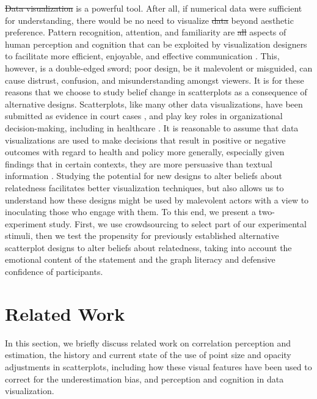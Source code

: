 \documentclass[manuscript,screen,review,anonymous]{acmart}
\providecommand{\DIFaddtex}[1]{{\protect\color{blue}\uwave{#1}}} %
\providecommand{\DIFdeltex}[1]{{\protect\color{red}\sout{#1}}} %
\providecommand{\DIFaddbegin}{} %
\providecommand{\DIFaddend}{} %
\providecommand{\DIFdelbegin}{} %
\providecommand{\DIFdelend}{} %
\providecommand{\DIFadd}[1]{\texorpdfstring{\DIFaddtex{#1}}{#1}} %
\providecommand{\DIFdel}[1]{\texorpdfstring{\DIFdeltex{#1}}{}} %
\newcommand{\DIFscaledelfig}{0.5}
\newlength{\DIFdelgraphicswidth} %
\newlength{\DIFdelgraphicsheight} %
\newcommand{\DIFaddincludegraphics}[2][]{{\color{blue}\fbox{\DIFOincludegraphics[#1]{#2}}}} %
\newcommand{\DIFdelincludegraphics}[2][]{%
\sbox{\DIFdelgraphicsbox}{\DIFOincludegraphics[#1]{#2}}%
\settoboxwidth{\DIFdelgraphicswidth}{\DIFdelgraphicsbox} %
\settoboxtotalheight{\DIFdelgraphicsheight}{\DIFdelgraphicsbox} %
\scalebox{\DIFscaledelfig}{%
\parbox[b]{\DIFdelgraphicswidth}{\usebox{\DIFdelgraphicsbox}\\[-\baselineskip] \rule{\DIFdelgraphicswidth}{0em}}\llap{\resizebox{\DIFdelgraphicswidth}{\DIFdelgraphicsheight}{%
\setlength{\unitlength}{\DIFdelgraphicswidth}%
\begin{picture}(1,1)%
\thicklines\linethickness{2pt} %
{\color[rgb]{1,0,0}\put(0,0){\framebox(1,1){}}}%
{\color[rgb]{1,0,0}\put(0,0){\line( 1,1){1}}}%
{\color[rgb]{1,0,0}\put(0,1){\line(1,-1){1}}}%
\end{picture}%
}\hspace*{3pt}}} %
} %
\DeclareRobustCommand{\DIFaddbegin}{\DIFOaddbegin \let\includegraphics\DIFaddincludegraphics} %
\DeclareRobustCommand{\DIFaddend}{\DIFOaddend \let\includegraphics\DIFOincludegraphics} %
\DeclareRobustCommand{\DIFdelbegin}{\DIFOdelbegin \let\includegraphics\DIFdelincludegraphics} %
\DeclareRobustCommand{\DIFdelend}{\DIFOaddend \let\includegraphics\DIFOincludegraphics} %
\begin{document}
\DIFdelbegin \DIFdel{Data visualization }\DIFdelend \DIFaddbegin \DIFadd{Visualization }\DIFaddend is a powerful tool. After all, if numerical data were
sufficient for understanding, there would be no need to visualize \DIFdelbegin \DIFdel{data
}\DIFdelend beyond
aesthetic preference. Pattern recognition, attention, and familiarity
are \DIFdelbegin \DIFdel{all }\DIFdelend aspects of human perception and cognition that can be exploited by
visualization designers to facilitate more efficient, enjoyable, and
effective communication \citep{franconeri_2021}. This, however, is a
double-edged sword; poor design, be it malevolent or misguided, can
cause distrust, confusion, and misunderstanding amongst viewers. It is
for these reasons that we choose to study belief change in scatterplots
as a consequence of alternative designs. Scatterplots, like many other
data visualizations, have been submitted as evidence in court cases
\citep{bobko_1979}, and play key roles in organizational
decision-making, including in healthcare \citep{poly_2019}. It is
reasonable to assume that data visualizations are used to make decisions
that result in positive or negative outcomes with regard to health and
policy more generally, especially given findings that in certain
contexts, they are more persuasive than textual information
\citep{pandey_2014}. Studying the potential for new designs to alter
beliefs about relatedness facilitates better visualization techniques,
but also allows us to understand how these designs might be used by
malevolent actors with a view to inoculating those who engage with them.
To this end, we present a two-experiment study. First, we use
crowdsourcing to select part of our experimental stimuli, then we test
the propensity for previously established alternative scatterplot
designs to alter beliefs about relatedness, taking into account the
emotional content of the statement and the graph literacy and defensive
confidence of participants.

\section{Related Work}\label{sec-rel-work-main}

In this section, we briefly discuss related work on correlation
perception and estimation, the history and current state of the use of
point size and opacity adjustments in scatterplots, including how these
visual features have been used to correct for the underestimation bias,
and perception and cognition in data visualization.
\end{document}
